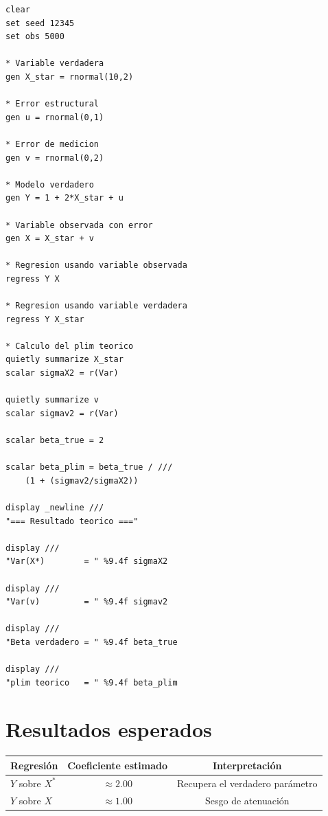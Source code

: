 \documentclass[12pt,letterpaper]{article}
\begin{document}
\begin{lstlisting}[caption={Simulación de error de medición y sesgo de atenuación}]
clear
set seed 12345
set obs 5000

* Variable verdadera
gen X_star = rnormal(10,2)

* Error estructural
gen u = rnormal(0,1)

* Error de medicion
gen v = rnormal(0,2)

* Modelo verdadero
gen Y = 1 + 2*X_star + u

* Variable observada con error
gen X = X_star + v

* Regresion usando variable observada
regress Y X

* Regresion usando variable verdadera
regress Y X_star

* Calculo del plim teorico
quietly summarize X_star
scalar sigmaX2 = r(Var)

quietly summarize v
scalar sigmav2 = r(Var)

scalar beta_true = 2

scalar beta_plim = beta_true / ///
    (1 + (sigmav2/sigmaX2))

display _newline ///
"=== Resultado teorico ==="

display ///
"Var(X*)        = " %9.4f sigmaX2

display ///
"Var(v)         = " %9.4f sigmav2

display ///
"Beta verdadero = " %9.4f beta_true

display ///
"plim teorico   = " %9.4f beta_plim
\end{lstlisting}

\section{Resultados esperados}

\begin{center}
\renewcommand{\arraystretch}{1.3}

\begin{tabular}{lcc}
\toprule
\textbf{Regresión} & \textbf{Coeficiente estimado} & \textbf{Interpretación} \\
\midrule
$Y$ sobre $X^{*}$ & $\approx 2.00$ & Recupera el verdadero parámetro \\
$Y$ sobre $X$     & $\approx 1.00$ & Sesgo de atenuación \\
\bottomrule
\end{tabular}
\end{center}
\end{document}
